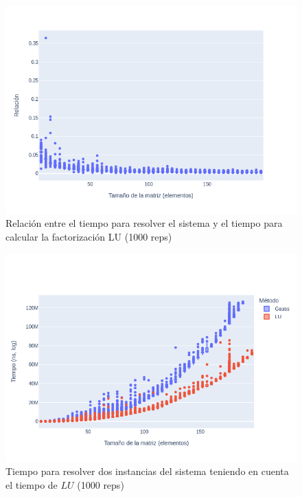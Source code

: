 \documentclass[12pt]{article}
\begin{document}
\begin{figure}[H]
\centering
\includegraphics[scale=0.5]{times.1.t_pct_lu}
\caption{Relación entre el tiempo para resolver el sistema y el tiempo para calcular la factorización LU (1000 reps)}
\label{fig:pct_lu.time}
\end{figure}

\begin{figure}[H]
\centering
\includegraphics[scale=0.5]{times.2.t_solve_lu}
\caption{Tiempo para resolver dos instancias del sistema teniendo en cuenta el tiempo de \(LU\) (1000 reps)}
\label{fig:time.2solve}
\end{figure}
\end{document}
